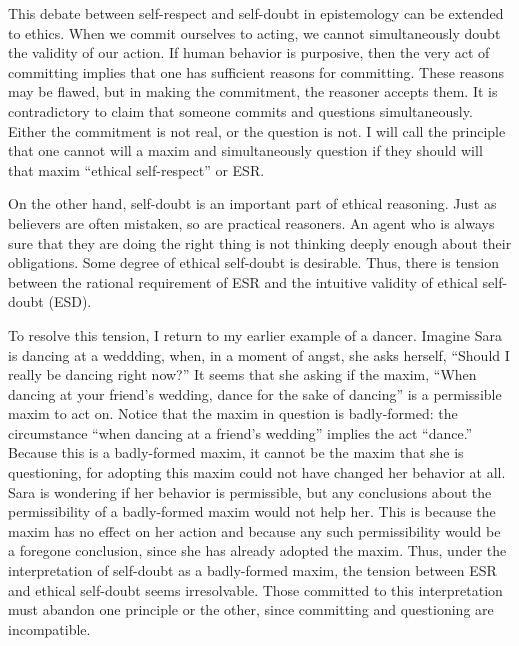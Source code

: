 \begin{isabellebody}
\begin{isamarkuptext}
This debate between self-respect and self-doubt in epistemology can be extended to ethics. When we 
commit ourselves to acting, we cannot simultaneously doubt the validity of our action. If human 
behavior is purposive, then the very act of committing implies that one has sufficient reasons for 
committing. These reasons may be flawed, but in making the commitment, the reasoner accepts them. It 
is contradictory to claim that someone commits and questions simultaneously. Either the commitment 
is not real, or the question is not. I will call the principle that one cannot will a maxim and 
simultaneously question if they should will that maxim ``ethical self-respect'' or ESR.

On the other hand, self-doubt is an important part of ethical reasoning. Just as believers are often 
mistaken, so are practical reasoners. An agent who is always sure that they are doing the right thing 
is not thinking deeply enough about their obligations. Some degree of ethical self-doubt is desirable. 
Thus, there is tension between the rational requirement of ESR and the intuitive validity of ethical 
self-doubt (ESD).

To resolve this tension, I return to my earlier example of a dancer. Imagine Sara is dancing at a 
weddding, when, in a moment of angst, she asks herself, ``Should I really be dancing right now?'' 
It seems that she asking if the maxim, ``When dancing at your friend's wedding, dance for the sake 
of dancing'' is a permissible maxim to act on. Notice that the maxim in question is badly-formed: the 
circumstance ``when dancing at a friend's wedding'' implies the act ``dance.'' Because this is a 
badly-formed maxim, it cannot be the maxim that she is questioning, for adopting
this maxim could not have changed her behavior at all. Sara is wondering if her behavior is permissible, but
any conclusions about the permissibility of a badly-formed maxim would not help her. This is because 
the maxim has no effect on her action and because any such permissibility would be a foregone conclusion,
since she has already adopted the maxim. Thus, under the interpretation of self-doubt as a badly-formed 
maxim, the tension between ESR and ethical self-doubt seems irresolvable. Those committed to this 
interpretation must abandon one principle or the other, since committing and questioning are incompatible.


\end{isamarkuptext}
\end{isabellebody}
